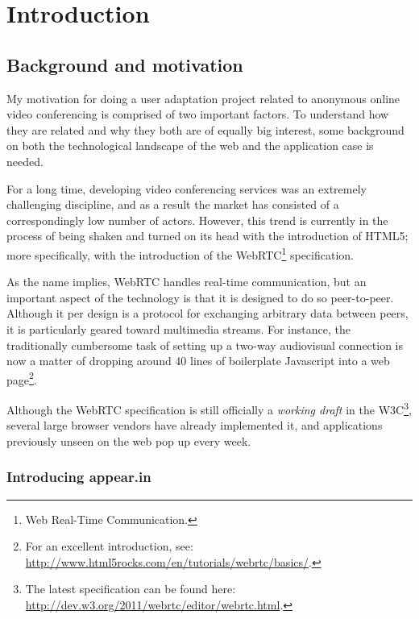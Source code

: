 \chapter{Introduction}

\label{Chapter1}



\section{Background and motivation}
\label{sec:motivation}

My motivation for doing a user adaptation project related to anonymous online video conferencing is comprised of two important factors. To understand how they are related and why they both are of equally big interest, some background on both the technological landscape of the web and the application case is needed.

For a long time, developing video conferencing services was an extremely challenging discipline, and as a result the market has consisted of a correspondingly low number of actors. However, this trend is currently in the process of being shaken and turned on its head with the introduction of HTML5; more specifically, with the introduction of the WebRTC\footnote{Web Real-Time Communication.} specification.

As the name implies, WebRTC handles real-time communication, but an important aspect of the technology is that it is designed to do so peer-to-peer. Although it per design is a protocol for exchanging arbitrary data between peers, it is particularly geared toward multimedia streams. For instance, the traditionally cumbersome task of setting up a two-way audiovisual connection is now a matter of dropping around 40 lines of boilerplate Javascript into a web page\footnote{For an excellent introduction, see: \url{http://www.html5rocks.com/en/tutorials/webrtc/basics/}.}.

Although the WebRTC specification is still officially a \emph{working draft} in the W3C\footnote{The latest specification can be found here: \url{http://dev.w3.org/2011/webrtc/editor/webrtc.html}.}, several large browser vendors have already implemented it, and applications previously unseen on the web pop up every week.

\subsection{Introducing appear.in}

